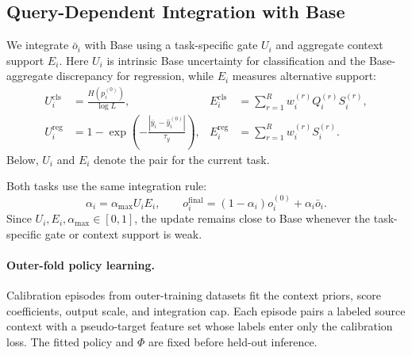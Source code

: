\subsection{Query-Dependent Integration with Base}
\label{sec:base_integration}

We integrate $\bar o_i$ with Base using a task-specific gate $U_i$ and aggregate
context support $E_i$. Here $U_i$ is intrinsic Base uncertainty for classification
and the Base-aggregate discrepancy for regression, while $E_i$ measures
alternative support:
\begin{equation}
  \begin{aligned}
    U_i^{\mathrm{cls}}&=\frac{H(p_i^{(0)})}{\log L},
    &E_i^{\mathrm{cls}}&=\sum_{r=1}^{R}w_i^{(r)}Q_i^{(r)}S_i^{(r)},\\
    U_i^{\mathrm{reg}}&=1-\exp\!\left(-\frac{|\bar y_i-\hat y_i^{(0)}|}{\tau_y}\right),
    &E_i^{\mathrm{reg}}&=\sum_{r=1}^{R}w_i^{(r)}S_i^{(r)}.
  \end{aligned}
  \label{eq:context_integration_evidence}
\end{equation}
Below, $U_i$ and $E_i$ denote the pair for the current task.

Both tasks use the same integration rule:
\begin{equation}
  \alpha_i=\alpha_{\max}U_iE_i,
  \qquad o_i^{\mathrm{final}}
  =(1-\alpha_i)o_i^{(0)}+\alpha_i\bar o_i.
  \label{eq:base_anchored_update}
\end{equation}
Since $U_i,E_i,\alpha_{\max}\in[0,1]$, the update remains close to Base whenever
the task-specific gate or context support is weak.

\paragraph{Outer-fold policy learning.}
Calibration episodes from outer-training datasets fit the context priors, score
coefficients, output scale, and integration cap. Each episode pairs a labeled
source context with a pseudo-target feature set whose labels enter only the
calibration loss. The fitted policy and $\Phi$ are fixed before held-out inference.
